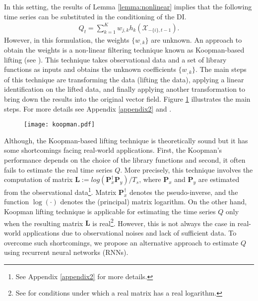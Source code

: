 In this setting, the results of Lemma \ref{lemma:nonlinear} implies that the following time series can be substituted in the conditioning of the DI. 
\begin{align}
    Q_t = \sum_{k=1}^K w_{j,k} h_k(\mathcal{X}_{-\{i\},t-1}).
\end{align}
However, in this formulation, the weights $\{w_{,k}\}$ are unknown. 
An approach to obtain the weights is a non-linear filtering technique known as Koopman-based lifting (see \citet{koopman1931hamiltonian}). 
This technique takes observational data and a set of library functions as inputs and obtains the unknown coefficients $\{w_{,k}\}$.
The main steps of this technique are transforming the data (lifting the data),  applying a linear identification on the lifted data, and finally applying another transformation to bring down the results into the original vector field.  Figure \ref{fig:koopman} illustrates the main steps. For more details see Appendix \ref{appendix2} and \citet{mauroy2019koopman}. 
\begin{figure}[h]
\centering
\texttt{[image: koopman.pdf]}
\label{fig:koopman}
\end{figure}

Although, the Koopman-based lifting technique is theoretically sound but it has some shortcomings facing real-world applications.
First, the Koopman's performance depends on the choice of the library functions and second, it often fails to estimate the real time series $Q$.
More precisely, this technique involves the computation of matrix $\textbf{L}:=log(\textbf{P}_x^{\dagger}\textbf{P}_y)/T_s$, where $\textbf{P}_x$ and $\textbf{P}_y$ are estimated from the observational data\footnote{See Appendix \ref{appendix2} for more details.}.
Matrix $\textbf{P}_x^{\dagger}$ denotes the pseudo-inverse, and the function $\log(\cdot)$ denotes the (principal) matrix logarithm.
On the other hand, Koopman lifting technique is applicable for estimating the time series $Q$ only when the resulting matrix $\textbf{L}$ is real\footnote{See \citet{culver1966existence} for conditions under which a real matrix has a real logarithm.}.
However, this is not always the case in real-world applications due to observational noises and lack of sufficient data. 
To overcome such shortcomings, we propose an alternative approach to estimate $Q$ using recurrent neural networks (RNNs).

